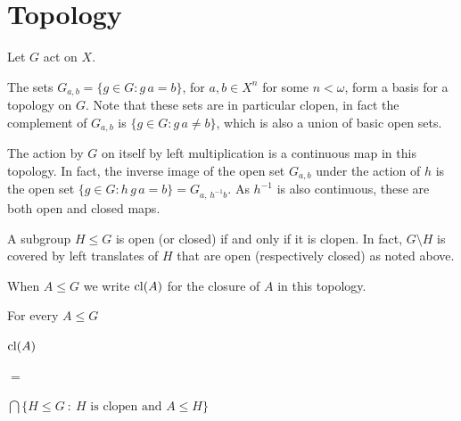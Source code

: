 \section{Topology}
\label{topology}

Let $G$ act on $X$.

\def\ceq#1#2#3{\noindent\parbox[t]{15ex}{$\displaystyle #1$}\parbox{6ex}{\hfil $#2$}{$\displaystyle #3$}}

The sets $G_{a,b}=\big\{g\in G:g\,a=b\big\}$, for $a,b\in X^n$ for some $n<\omega$, form a basis for a topology on $G$.
Note that these sets are in particular clopen, in fact the complement of $G_{a,b}$ is $\big\{g\in G:g\,a\neq b\big\}$, which is also a union of basic open sets.

The action by $G$ on itself by left multiplication is a continuous map in this topology.
In fact, the inverse image of the open set $G_{a,b}$ under the action of $h$ is the open set $\big\{g\in G:h\,g\,a=b\big\}=G_{a,\,h^{-1}b}$.
As $h^{-1}$ is also continuous, these are both open and closed maps.

A subgroup $H\le G$ is open (or closed) if and only if it is clopen.
In fact, $G\setminus H$ is covered by left translates of $H$ that are open (respectively closed) as noted above.

When $A\le G$ we write ${\rm cl}(A)$ for the closure of $A$ in this topology.

\begin{fact}
  For every $A\le G$\smallskip

  \ceq{\hfill{\rm cl}(A)}{=}{\bigcap\Big\{H\le G\ :\ H\text{ is clopen and }A\le H\Big\}}
\end{fact}